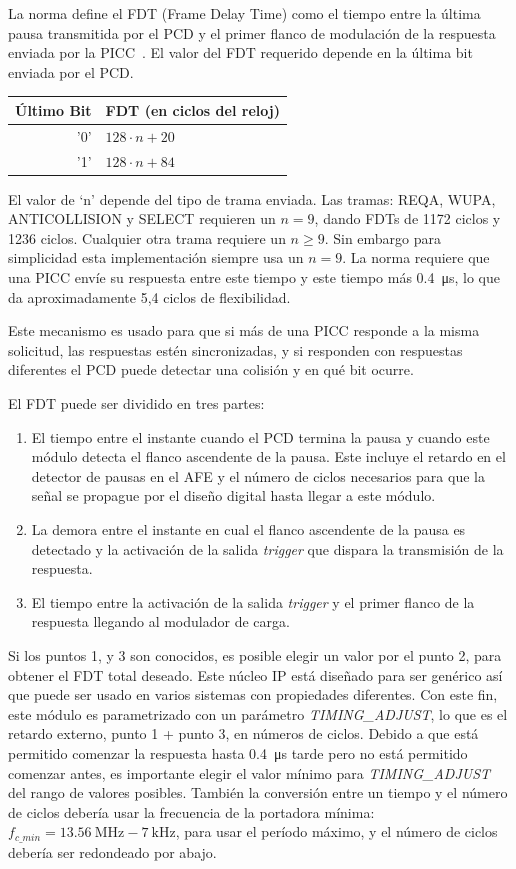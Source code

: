 \documentclass[a4paper, twoside, 11pt]{report}
\begin{document}
La norma define el FDT (Frame Delay Time) como el tiempo entre la última pausa transmitida por el PCD y el primer flanco de modulación de la respuesta enviada por la PICC~\cite{iso14443-3}. El valor del FDT requerido depende en la última bit enviada por el PCD.

\begin{tabular}{r | l}
    \textbf{Último} Bit & \textbf{FDT (en ciclos del reloj)} \\
    \hline
    '0' & $128 \cdot n + 20$ \\
    '1' & $128 \cdot n + 84$ \\
\end{tabular}

El valor de ‘n’ depende del tipo de trama enviada. Las tramas: REQA, WUPA, ANTICOLLISION y SELECT requieren un $n = 9$, dando FDTs de 1172 ciclos y 1236 ciclos. Cualquier otra trama requiere un $n \ge 9$. Sin embargo para simplicidad esta implementación siempre usa un $n = 9$. La norma requiere que una PICC envíe su respuesta entre este tiempo y este tiempo más \SI{0.4}{\micro\second}, lo que da aproximadamente 5,4 ciclos de flexibilidad.

Este mecanismo es usado para que si más de una PICC responde a la misma solicitud, las respuestas estén sincronizadas, y si responden con respuestas diferentes el PCD puede detectar una colisión y en qué bit ocurre.

El FDT puede ser dividido en tres partes:

\begin{enumerate}
  \item El tiempo entre el instante cuando el PCD termina la pausa y cuando este módulo detecta el flanco ascendente de la pausa. Este incluye el retardo en el detector de pausas en el AFE y el número de ciclos necesarios para que la señal se propague por el diseño digital hasta llegar a este módulo.
  \item La demora entre el instante en cual el flanco ascendente de la pausa es detectado y la activación de la salida \textit{trigger} que dispara la transmisión de la respuesta.
  \item El tiempo entre la activación de la salida \textit{trigger} y el primer flanco de la respuesta llegando al modulador de carga.
\end{enumerate}

Si los puntos 1, y 3 son conocidos, es posible elegir un valor por el punto 2, para obtener el FDT total deseado. Este núcleo IP está diseñado para ser genérico así que puede ser usado en varios sistemas con propiedades diferentes. Con este fin, este módulo es parametrizado con un parámetro \textit{TIMING\_ADJUST}, lo que es el retardo externo, punto 1 + punto 3, en números de ciclos. Debido a que está permitido comenzar la respuesta hasta \SI{0,4}{\micro\second} tarde pero no está permitido comenzar antes, es importante elegir el valor mínimo para  \textit{TIMING\_ADJUST} del rango de valores posibles. También la conversión entre un tiempo y el número de ciclos debería usar la frecuencia de la portadora mínima: $f_{c\_min} = \SI{13.56}{\mega\hertz} - \SI{7}{\kilo\hertz}$, para usar el período máximo, y el número de ciclos debería ser redondeado por abajo.
\end{document}
